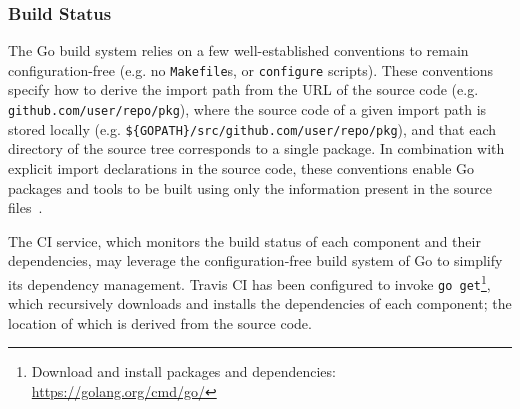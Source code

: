 
\subsubsection{Build Status}

The Go build system relies on a few well-established conventions to remain configuration-free (e.g. no \texttt{Makefile}s, or \texttt{configure} scripts). These conventions specify how to derive the import path from the URL of the source code (e.g. \texttt{github.com/user/repo/pkg}), where the source code of a given import path is stored locally (e.g. \texttt{\$\{GOPATH\}/src/github.com/user/repo/pkg}), and that each directory of the source tree corresponds to a single package. In combination with explicit import declarations in the source code, these conventions enable Go packages and tools to be built using only the information present in the source files~\cite{go_command}.

The CI service, which monitors the build status of each component and their dependencies, may leverage the configuration-free build system of Go to simplify its dependency management. Travis CI has been configured to invoke \texttt{go get}\footnote{Download and install packages and dependencies: \url{https://golang.org/cmd/go/}}, which recursively downloads and installs the dependencies of each component; the location of which is derived from the source code.
